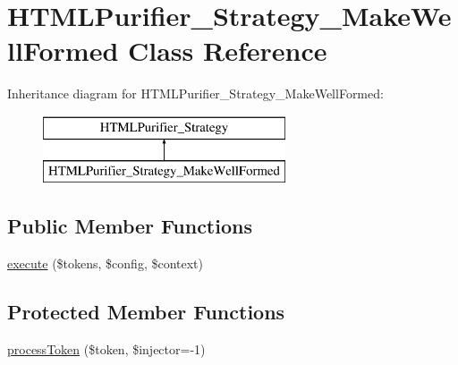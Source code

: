 \hypertarget{classHTMLPurifier__Strategy__MakeWellFormed}{\section{H\+T\+M\+L\+Purifier\+\_\+\+Strategy\+\_\+\+Make\+Well\+Formed Class Reference}
\label{classHTMLPurifier__Strategy__MakeWellFormed}
}
Inheritance diagram for H\+T\+M\+L\+Purifier\+\_\+\+Strategy\+\_\+\+Make\+Well\+Formed\+:\begin{figure}[H]
\begin{center}
\leavevmode
\includegraphics[height=2.000000cm]{classHTMLPurifier__Strategy__MakeWellFormed}
\end{center}
\end{figure}
\subsection*{Public Member Functions}
\begin{DoxyCompactItemize}
\item 
\hyperlink{classHTMLPurifier__Strategy__MakeWellFormed_a5df01929414200f139e4b76ee94d3774}{execute} (\$tokens, \$config, \$context)
\end{DoxyCompactItemize}
\subsection*{Protected Member Functions}
\begin{DoxyCompactItemize}
\item 
\hyperlink{classHTMLPurifier__Strategy__MakeWellFormed_acca8bdc532ca1469b16299040f682446}{process\+Token} (\$token, \$injector=-\/1)
\end{DoxyCompactItemize}
